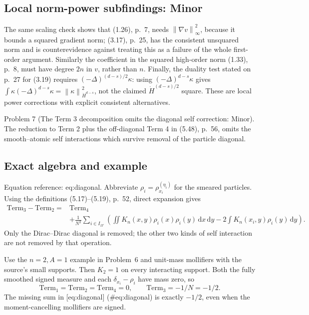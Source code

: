 \documentclass[10pt]{article}
\begin{document}
\subsection*{Local norm-power subfindings: Minor}
The same scaling check shows that (1.26), p. 7, needs \(\left\lVert \nabla v\right\rVert_\infty^2\), because it bounds a squared gradient norm; (3.17), p. 25, has the consistent unsquared norm and is counterevidence against treating this as a failure of the whole first-order argument. Similarly the coefficient in the squared high-order norm (1.33), p. 8, must have degree \(2n\) in \(v\), rather than \(n\). Finally, the duality test stated on p. 27 for (3.19) requires \((-\Delta)^{(d-s)/2}\kappa\): using \((-\Delta)^{d-s}\kappa\) gives \(\int\kappa(-\Delta)^{d-s}\kappa=\left\lVert \kappa\right\rVert_{\dot H^{d-s}}^2\), not the claimed \(\dot H^{(d-s)/2}\) square. These are local power corrections with explicit consistent alternatives.\par
Problem 7 (The Term 3 decomposition omits the diagonal self correction: Minor).  The reduction to Term 2 plus the off-diagonal Term 4 in (5.48), p. 56, omits the smooth–atomic self interactions which survive removal of the particle diagonal.\par
\subsection*{Exact algebra and example}
Equation reference: eq:diagonal. Abbreviate \(\rho_i=\rho_{x_i}^{(\eta_i)}\) for the smeared particles. Using the definitions (5.17)–(5.19), p. 52, direct expansion gives \[\begin{aligned}

 \mathrm{Term}_3-\mathrm{Term}_2
 ={}&\mathrm{Term}_4\\
 &+\frac1{N^2}\sum_{i\in I_{\Omega'}}
 \left(\iint K_n(x,y)\rho_i(x)\rho_i(y)\,\mathrm dx\,\mathrm dy
       -2\int K_n(x_i,y)\rho_i(y)\,\mathrm dy\right).\nonumber\end{aligned}\] Only the Dirac–Dirac diagonal is removed; the other two kinds of self interaction are not removed by that operation.\par
Use the \(n=2,A=1\) example in Problem 6 and unit-mass mollifiers with the source’s small supports. Then \(K_2=1\) on every interacting support. Both the fully smoothed signed measure and each \(\delta_{x_i}-\rho_i\) have mass zero, so \[\mathrm{Term}_1=\mathrm{Term}_2=\mathrm{Term}_4=0,\qquad
 \mathrm{Term}_3=-1/N=-1/2 .\] The missing sum in [eq:diagonal] (\#eq:diagonal) is exactly \(-1/2\), even when the moment-cancelling mollifiers are signed.\par
\end{document}

